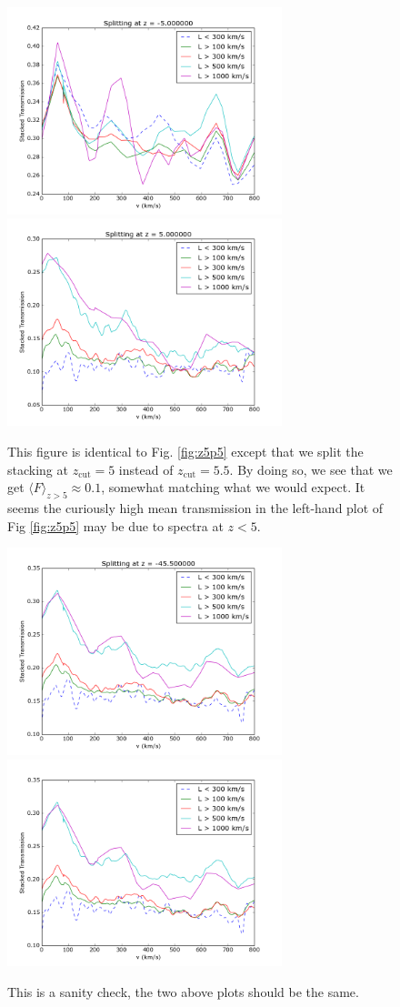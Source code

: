 \documentclass[11pt]{article}
\begin{document}
\begin{figure}[h]
  \centering
  \includegraphics[width=8cm]{Stack_Zlessthan5.png}
  \includegraphics[width=8cm]{Stack_Zgreaterthan5.png}
  \caption{This figure is identical to Fig. \ref{fig:z5p5} except that we split the stacking at $z_{\text{cut}} = 5$ instead of $z_{\text{cut}} = 5.5$. By doing so, we see that we get $\langle F \rangle_{z>5} \approx 0.1$, somewhat matching what we would expect. It seems the curiously high mean transmission in the left-hand plot of Fig \ref{fig:z5p5} may be due to spectra at $z < 5$.}
  \label{fig:todo}
\end{figure}


\begin{figure}[h]
  \centering
  \includegraphics[width=8cm]{Stack_SanityCut.png}
  \includegraphics[width=8cm]{Stack_SanityCutCorrect.png}
  \caption{This is a sanity check, the two above plots should be the same.}
  \label{fig:todo}
\end{figure}
\end{document}
